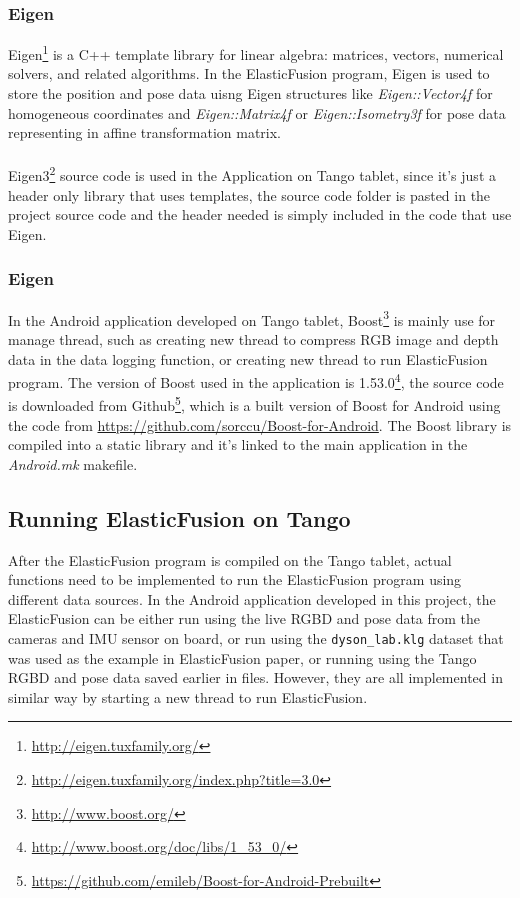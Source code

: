 \documentclass[12pt,twoside]{article}
\begin{document}
\subsubsection{Eigen}
Eigen\footnote{\url{http://eigen.tuxfamily.org/}} is a C++ template library for linear algebra: matrices, vectors, numerical solvers, and related algorithms. In the ElasticFusion program, Eigen is used to store the position and pose data uisng Eigen structures like \textit{Eigen::Vector4f} for homogeneous coordinates and \textit{Eigen::Matrix4f} or \textit{Eigen::Isometry3f} for pose data representing in affine transformation matrix.\\
\\
Eigen3\footnote{\url{http://eigen.tuxfamily.org/index.php?title=3.0}} source code is used in the Application on Tango tablet, since it's just a header only library that uses templates, the source code folder is pasted in the project source code and the header needed is simply included in the code that use Eigen.\\



\subsubsection{Eigen}
In the Android application developed on Tango tablet, Boost\footnote{\url{http://www.boost.org/}} is mainly use for manage thread, such as creating new thread to compress RGB image and depth data in the data logging function, or creating new thread to run ElasticFusion program. The version of Boost used in the application is 1.53.0\footnote{\url{http://www.boost.org/doc/libs/1_53_0/}}, the source code is downloaded from Github\footnote{\url{https://github.com/emileb/Boost-for-Android-Prebuilt}}, which is a built version of Boost for Android using the code from \url{https://github.com/sorccu/Boost-for-Android}. The Boost library is compiled into a static library and it's linked to the main application in the \textit{Android.mk} makefile.


\newpage



\subsection{Running ElasticFusion on Tango}

After the ElasticFusion program is compiled on the Tango tablet, actual functions need to be implemented to run the ElasticFusion program using different data sources. In the Android application developed in this project, the ElasticFusion can be either run using the live RGBD and pose data from the cameras and IMU sensor on board, or run using the \verb|dyson_lab.klg| dataset that was used as the example in ElasticFusion paper\citep{whelan2016elasticfusion}, or running using the Tango RGBD and pose data saved earlier in files. However, they are all implemented in similar way by starting a new thread to run ElasticFusion. \\
\end{document}
